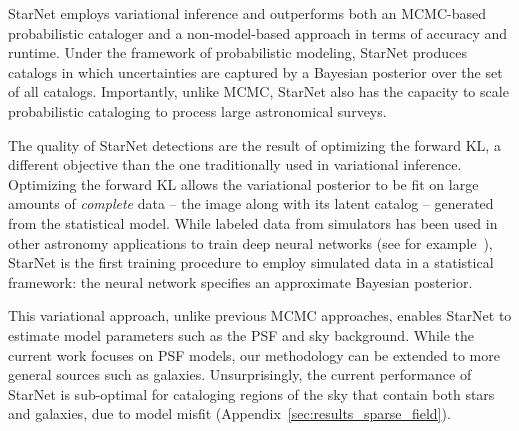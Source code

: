 StarNet employs variational inference and outperforms both an MCMC-based probabilistic cataloger and a non-model-based approach in terms of accuracy and runtime. 
Under the framework of probabilistic modeling, 
StarNet produces catalogs in which uncertainties are captured by a Bayesian posterior over the set of all catalogs.
Importantly, unlike MCMC, StarNet also has the capacity to scale probabilistic cataloging to process large astronomical surveys. 

The quality of StarNet detections are the result of optimizing the forward KL, a different objective than the one traditionally used in variational inference. 
Optimizing the forward KL allows the variational posterior to be fit on large amounts of {\itshape complete} data -- the image along with its latent catalog -- generated from the statistical model. 
While labeled data from simulators has been used in other astronomy applications to train deep neural networks (see for example~\cite{Lanusse_2017_cmudeeplens, huang2019finding}), StarNet is the first training procedure to employ simulated data in a statistical framework: the neural network specifies an approximate Bayesian posterior. 


This variational approach, unlike previous MCMC approaches, enables StarNet to estimate model parameters such as the PSF and sky background.
While the current work focuses on PSF models, our methodology can be extended to more general sources such as galaxies. 
Unsurprisingly, the current performance of StarNet is sub-optimal for cataloging regions of the sky that contain both stars and galaxies, due to model misfit (Appendix~\ref{sec:results_sparse_field}).  

